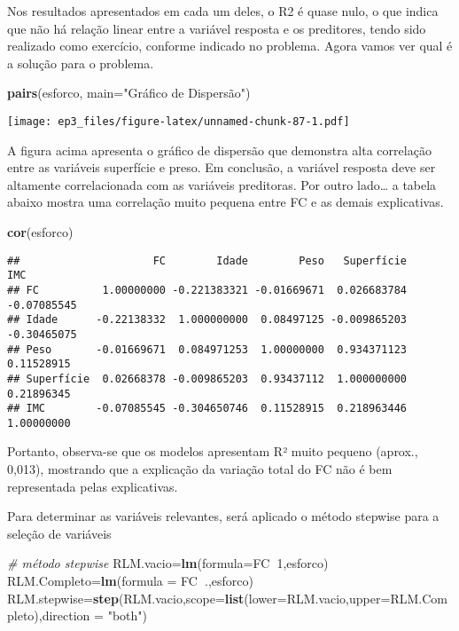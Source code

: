 \documentclass[]{article}
\newenvironment{Shaded}{\begin{snugshade}}{\end{snugshade}}
\newcommand{\CommentTok}[1]{\textcolor[rgb]{0.56,0.35,0.01}{\textit{#1}}}
\newcommand{\DataTypeTok}[1]{\textcolor[rgb]{0.13,0.29,0.53}{#1}}
\newcommand{\DecValTok}[1]{\textcolor[rgb]{0.00,0.00,0.81}{#1}}
\newcommand{\KeywordTok}[1]{\textcolor[rgb]{0.13,0.29,0.53}{\textbf{#1}}}
\newcommand{\NormalTok}[1]{#1}
\newcommand{\OperatorTok}[1]{\textcolor[rgb]{0.81,0.36,0.00}{\textbf{#1}}}
\newcommand{\StringTok}[1]{\textcolor[rgb]{0.31,0.60,0.02}{#1}}
\begin{document}
Nos resultados apresentados em cada um deles, o R2 é quase nulo, o que
indica que não há relação linear entre a variável resposta e os
preditores, tendo sido realizado como exercício, conforme indicado no
problema. Agora vamos ver qual é a solução para o problema.

\begin{Shaded}
\begin{Highlighting}[]
\KeywordTok{pairs}\NormalTok{(esforco, }\DataTypeTok{main=}\StringTok{"Gráfico de Dispersão"}\NormalTok{) }
\end{Highlighting}
\end{Shaded}

\texttt{[image: ep3\_files/figure-latex/unnamed-chunk-87-1.pdf]}

A figura acima apresenta o gráfico de dispersão que demonstra alta
correlação entre as variáveis superfície e preso. Em conclusão, a
variável resposta deve ser altamente correlacionada com as variáveis
preditoras. Por outro lado\ldots{} a tabela abaixo mostra uma correlação
muito pequena entre FC e as demais explicativas.

\begin{Shaded}
\begin{Highlighting}[]
\KeywordTok{cor}\NormalTok{(esforco)}
\end{Highlighting}
\end{Shaded}

\begin{verbatim}
##                     FC        Idade        Peso   Superfície         IMC
## FC          1.00000000 -0.221383321 -0.01669671  0.026683784 -0.07085545
## Idade      -0.22138332  1.000000000  0.08497125 -0.009865203 -0.30465075
## Peso       -0.01669671  0.084971253  1.00000000  0.934371123  0.11528915
## Superfície  0.02668378 -0.009865203  0.93437112  1.000000000  0.21896345
## IMC        -0.07085545 -0.304650746  0.11528915  0.218963446  1.00000000
\end{verbatim}

Portanto, observa-se que os modelos apresentam R² muito pequeno (aprox.,
0,013), mostrando que a explicação da variação total do FC não é bem
representada pelas explicativas.

Para determinar as variáveis relevantes, será aplicado o método stepwise
para a seleção de variáveis

\begin{Shaded}
\begin{Highlighting}[]
\CommentTok{# método stepwise}
\NormalTok{RLM.vacio=}\KeywordTok{lm}\NormalTok{(}\DataTypeTok{formula=}\NormalTok{FC}\OperatorTok{~}\DecValTok{1}\NormalTok{,esforco)}
\NormalTok{RLM.Completo=}\KeywordTok{lm}\NormalTok{(}\DataTypeTok{formula =}\NormalTok{ FC}\OperatorTok{~}\NormalTok{.,esforco)}
\NormalTok{RLM.stepwise=}\KeywordTok{step}\NormalTok{(RLM.vacio,}\DataTypeTok{scope=}\KeywordTok{list}\NormalTok{(}\DataTypeTok{lower=}\NormalTok{RLM.vacio,}\DataTypeTok{upper=}\NormalTok{RLM.Completo),}\DataTypeTok{direction =} \StringTok{"both"}\NormalTok{)}
\end{Highlighting}
\end{Shaded}
\end{document}
